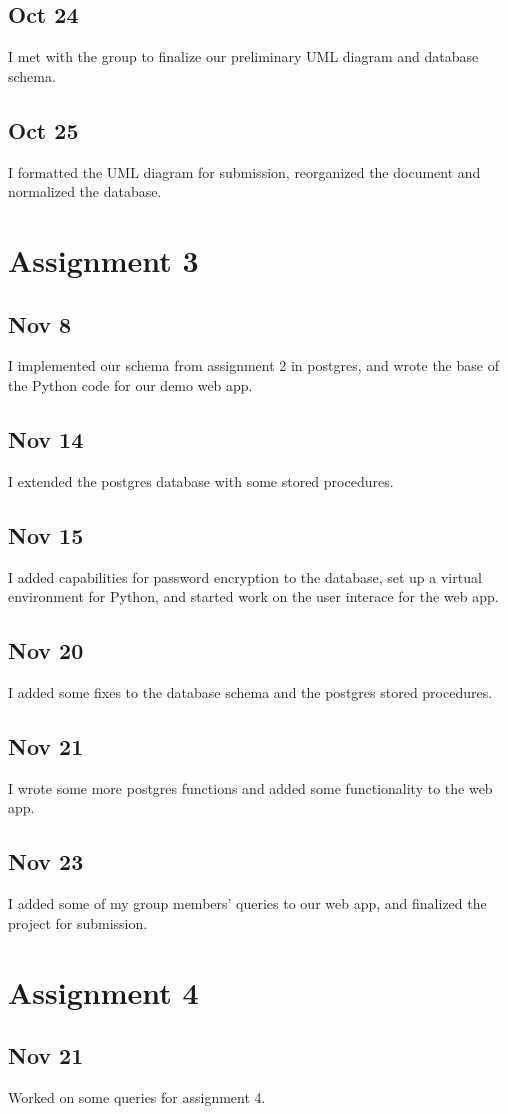 \documentclass[11pt]{article}
\begin{document}
\subsection*{Oct 24}
I met with the group to finalize our preliminary UML diagram and database schema.


\subsection*{Oct 25}
I formatted the UML diagram for submission, reorganized the document and normalized the database.

\section*{Assignment 3}
\subsection*{Nov 8}
I implemented our schema from assignment 2 in postgres, and wrote the base of
the Python code for our demo web app.


\subsection*{Nov 14}
I extended the postgres database with some stored procedures.


\subsection*{Nov 15}
I added capabilities for password encryption to the database, set up a
virtual environment for Python, and started work on the user interace for the
web app.


\subsection*{Nov 20}
I added some fixes to the database schema and the postgres stored procedures.


\subsection*{Nov 21}
I wrote some more postgres functions and added some functionality to the web
app.


\subsection*{Nov 23}
I added some of my group members' queries to our web app, and finalized the
project for submission.

\section*{Assignment 4}
\subsection*{Nov 21}
Worked on some queries for assignment 4.
\end{document}
